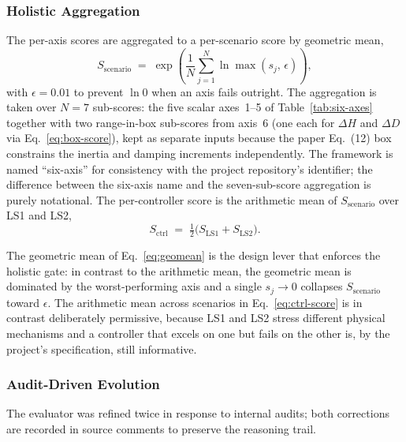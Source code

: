 \documentclass{unnc-fyp}
\begin{document}
\subsubsection{Holistic Aggregation}

The per-axis scores are aggregated to a per-scenario score by
geometric mean,
\begin{equation}
  S_\mathrm{scenario}
  \;=\; \exp\!\left(\frac{1}{N}\sum_{j=1}^{N}
                    \ln \max(s_j,\,\epsilon)\right),
  \label{eq:geomean}
\end{equation}
with $\epsilon = 0.01$ to prevent $\ln 0$ when an axis fails
outright.
The aggregation is taken over $N = 7$ sub-scores: the five scalar
axes~1--5 of Table~\ref{tab:six-axes} together with two
range-in-box sub-scores from axis~6 (one each for $\Delta H$ and
$\Delta D$ via Eq.~\eqref{eq:box-score}), kept as separate inputs
because the paper Eq.~(12) box constrains the inertia and damping
increments independently.
The framework is named ``six-axis'' for consistency with the
project repository's identifier; the difference between the
six-axis name and the seven-sub-score aggregation is purely
notational.
The per-controller score is the arithmetic mean of
$S_\mathrm{scenario}$ over LS1 and LS2,
\begin{equation}
  S_\mathrm{ctrl}
  \;=\; \tfrac{1}{2}\bigl(S_\mathrm{LS1} + S_\mathrm{LS2}\bigr).
  \label{eq:ctrl-score}
\end{equation}

The geometric mean of Eq.~\eqref{eq:geomean} is the design lever
that enforces the holistic gate: in contrast to the arithmetic
mean, the geometric mean is dominated by the worst-performing
axis and a single $s_j \to 0$ collapses $S_\mathrm{scenario}$
toward $\epsilon$.
The arithmetic mean across scenarios in
Eq.~\eqref{eq:ctrl-score} is in contrast deliberately
permissive, because LS1 and LS2 stress different physical
mechanisms and a controller that excels on one but fails on the
other is, by the project's specification, still informative.

\subsubsection{Audit-Driven Evolution}

The evaluator was refined twice in response to internal audits;
both corrections are recorded in source comments to preserve the
reasoning trail.
\end{document}
